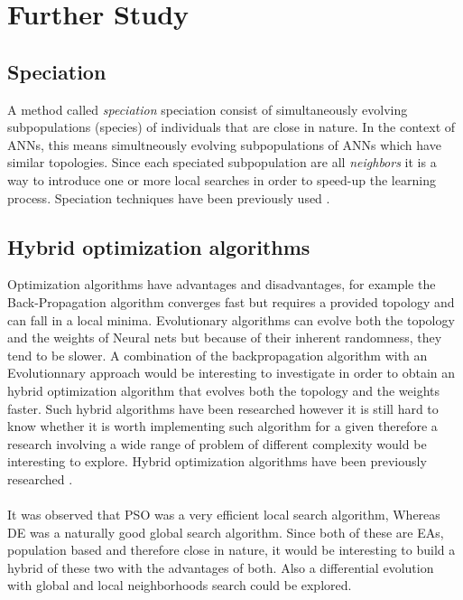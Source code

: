 \documentclass[a4paper,12pt, oneside]{memoir}
\begin{document}
\newpage

\section{Further Study}

\subsection{Speciation}

A method called \textit{speciation} speciation consist of simultaneously evolving subpopulations (species) of individuals that are close in nature. In the context of ANNs, this means simultneously evolving subpopulations of ANNs which have similar topologies. Since each speciated subpopulation are all \textit{neighbors} it is a way to introduce one or more local searches in order to speed-up the learning process. Speciation techniques have been previously used \cite{stanley-2002}.

\subsection{Hybrid optimization algorithms}

Optimization algorithms have advantages and disadvantages, for example the Back-Propagation algorithm converges fast but requires a provided topology and can fall in a local minima. Evolutionary algorithms can evolve both the topology and the weights of Neural nets but because of their inherent randomness, they tend to be slower. A combination of the backpropagation algorithm with an Evolutionnary approach would be interesting to investigate in order to obtain an hybrid optimization algorithm that evolves both the topology and the weights faster. Such hybrid algorithms have been researched however it is still hard to know whether it is worth implementing such algorithm for a given therefore a research involving a wide range of problem of different complexity would be interesting to explore. Hybrid optimization algorithms have been previously researched \cite{yao-1999}.
\\ \\
It was observed that PSO was a very efficient local search algorithm, Whereas DE was a naturally good global search algorithm. Since both of these are EAs, population based and therefore close in nature, it would be interesting to build a hybrid of these two with the advantages of both. Also a differential evolution with global and local neighborhoods search could be explored.
\end{document}
